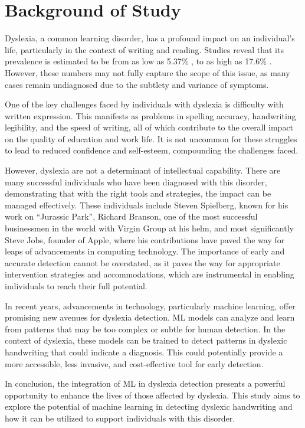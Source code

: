 \section{Background of Study}
Dyslexia, a common learning disorder, has a profound impact on an individual's life, particularly in the context of writing and reading. Studies reveal that its prevalence is estimated to be from as low as 5.37\% \parencite{Ashraf2011PrevalenceOD}, to as high as 17.6\% \parencite{Aboudan2011DyslexiaIT}. However, these numbers may not fully capture the scope of this issue, as many cases remain undiagnosed due to the subtlety and variance of symptoms.

One of the key challenges faced by individuals with dyslexia is difficulty with written expression. This manifests as problems in spelling accuracy, handwriting legibility, and the speed of writing, all of which contribute to the overall impact on the quality of education and work life. It is not uncommon for these struggles to lead to reduced confidence and self-esteem, compounding the challenges faced.

However, dyslexia are not a determinant of intellectual capability. There are many successful individuals who have been diagnosed with this disorder, demonstrating that with the right tools and strategies, the impact can be managed effectively. These individuals include Steven Spielberg, known for his work on “Jurassic Park”, Richard Branson, one of the most successful businessmen in the world with Virgin Group at his helm, and most significantly Steve Jobs, founder of Apple, where his contributions have paved the way for leaps of advancements in computing technology. The importance of early and accurate detection cannot be overstated, as it paves the way for appropriate intervention strategies and accommodations, which are instrumental in enabling individuals to reach their full potential.

In recent years, advancements in technology, particularly machine learning, offer promising new avenues for dyslexia detection. ML models can analyze and learn from patterns that may be too complex or subtle for human detection. In the context of dyslexia, these models can be trained to detect patterns in dyslexic handwriting that could indicate a diagnosis. This could potentially provide a more accessible, less invasive, and cost-effective tool for early detection.

In conclusion, the integration of ML in dyslexia detection presents a powerful opportunity to enhance the lives of those affected by dyslexia. This study aims to explore the potential of machine learning in detecting dyslexic handwriting and how it can be utilized to support individuals with this disorder.

